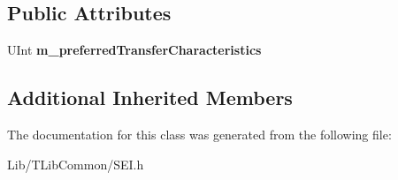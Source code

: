 \subsection*{Public Attributes}
\begin{DoxyCompactItemize}
\item 
\mbox{\label{class_s_e_i_alternative_transfer_characteristics_ab7c2c956b46972760128aa6739a5ac29}} 
U\+Int {\bfseries m\+\_\+preferred\+Transfer\+Characteristics}
\end{DoxyCompactItemize}
\subsection*{Additional Inherited Members}


The documentation for this class was generated from the following file\+:\begin{DoxyCompactItemize}
\item 
Lib/\+T\+Lib\+Common/S\+E\+I.\+h\end{DoxyCompactItemize}
